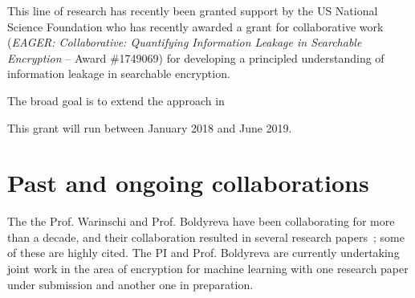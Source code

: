 This line of research has recently been granted support by the US National Science Foundation who has recently awarded a grant for collaborative work (\textit{EAGER: Collaborative: Quantifying Information Leakage in Searchable Encryption} -- Award \#1749069) for developing a principled understanding of information leakage in searchable encryption. 

The broad goal is to extend the approach in ~\cite{bernhard2012measuring} 


This grant will run between January 2018 and June 2019. 





\section{Past and ongoing collaborations}
\label{sec:prop_method}
The the Prof. Warinschi and Prof. Boldyreva have been collaborating for more than a decade, and their collaboration resulted in several research papers~\cite{boldyreva2007closer,boldyreva2009foundations,boldyreva2012secure,lipton2016provably}; some of these are  highly cited. 
The PI and Prof. Boldyreva are currently undertaking joint work in the area of encryption for machine learning with one research paper under submission and another one in preparation. 











